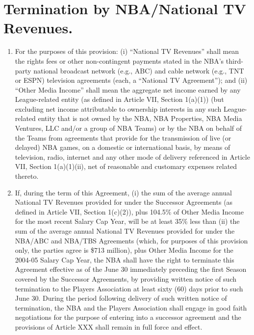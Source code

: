 \documentclass[
]{book}
\providecommand{\tightlist}{%
  \setlength{\itemsep}{0pt}\setlength{\parskip}{0pt}}
\begin{document}
\hypertarget{termination-by-nbanational-tv-revenues.}{%
\section{Termination by NBA/National TV Revenues.}\label{termination-by-nbanational-tv-revenues.}}

\begin{enumerate}
\def\labelenumi{(\alph{enumi})}
\tightlist
\item
  For the purposes of this provision: (i) ``National TV Revenues'' shall mean the rights fees or other non-contingent payments stated in the NBA's third-party national broadcast network (e.g., ABC) and cable network (e.g., TNT or ESPN) television agreements (each, a ``National TV Agreement''); and (ii) ``Other Media Income'' shall mean the aggregate net income earned by any League-related entity (as defined in Article VII, Section 1(a)(1)) (but excluding net income attributable to ownership interests in any such League-related entity that is not owned by the NBA, NBA Properties, NBA Media Ventures, LLC and/or a group of NBA Teams) or by the NBA on behalf of the Teams from agreements that provide for the transmission of live (or delayed) NBA games, on a domestic or international basis, by means of television, radio, internet and any other mode of delivery referenced in Article VII, Section 1(a)(1)(ii), net of reasonable and customary expenses related thereto.
\item
  If, during the term of this Agreement, (i) the sum of the average annual National TV Revenues provided for under the Successor Agreements (as defined in Article VII, Section 1(c)(2)), plus 104.5\% of Other Media Income for the most recent Salary Cap Year, will be at least 35\% less than (ii) the sum of the average annual National TV Revenues provided for under the NBA/ABC and NBA/TBS Agreements (which, for purposes of this provision only, the parties agree is \$713 million), plus Other Media Income for the 2004-05 Salary Cap Year, the NBA shall have the right to terminate this Agreement effective as of the June 30 immediately preceding the first Season covered by the Successor Agreements, by providing written notice of such termination to the Players Association at least sixty (60) days prior to such June 30. During the period following delivery of such written notice of termination, the NBA and the Players Association shall engage in good faith negotiations for the purpose of entering into a successor agreement and the provisions of Article XXX shall remain in full force and effect.
\end{enumerate}
\end{document}
